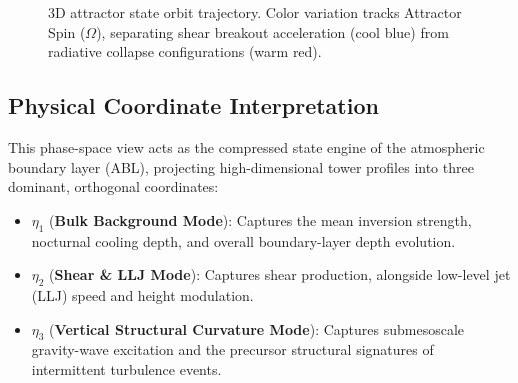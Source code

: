 \documentclass[11pt,a4paper]{article}
\begin{document}
\begin{figure}[htbp]
    \centering
    \caption{3D attractor state orbit trajectory. Color variation tracks Attractor Spin ($\Omega$), separating shear breakout acceleration (cool blue) from radiative collapse configurations (warm red).}
    \label{fig:attractor_CASES-99}
\end{figure}

\subsection{Physical Coordinate Interpretation}

This phase-space view acts as the compressed state engine of the atmospheric boundary layer (ABL), projecting high-dimensional tower profiles into three dominant, orthogonal coordinates:

\begin{itemize}
    \item $\eta_1$ (\textbf{Bulk Background Mode}): Captures the mean inversion strength, nocturnal cooling depth, and overall boundary-layer depth evolution.
    \item $\eta_2$ (\textbf{Shear \& LLJ Mode}): Captures shear production, alongside low-level jet (LLJ) speed and height modulation.
    \item $\eta_3$ (\textbf{Vertical Structural Curvature Mode}): Captures submesoscale gravity-wave excitation and the precursor structural signatures of intermittent turbulence events.
\end{itemize}
\end{document}
